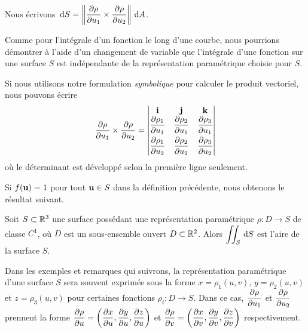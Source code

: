 {\begin{focus}{\dfn}
Nous écrivons
$\displaystyle \,\mathrm{d}S =
\left\| \frac{\partial \rho}{\partial u_1} \times \frac{\partial \rho}{\partial u_2} \right\|
\,\mathrm{d}A$.
\end{focus}

\begin{rmk}
Comme pour l'intégrale d'un fonction le long d'une courbe, nous
pourrions démontrer à l'aide d'un changement de variable
que l'intégrale d'une fonction sur une surface $S$ est
indépendante de la représentation paramétrique choisie pour $S$.
\end{rmk}

\begin{rmk}
Si nous utilisons notre formulation {\em symbolique} pour calculer le produit
vectoriel, nous pouvons écrire
\[
\frac{\partial \rho}{\partial u_1} \times \frac{\partial \rho}{\partial u_2}
= \begin{vmatrix}
\mathbf{i} & \mathbf{j} & \mathbf{k} \\
\displaystyle \frac{\partial \rho_1}{\partial u_1} & \displaystyle \frac{\partial \rho_2}{\partial u_1} &
\displaystyle \frac{\partial \rho_3}{\partial u_1} \\[0.8em]
\displaystyle \frac{\partial \rho_1}{\partial u_2} & \displaystyle \frac{\partial \rho_2}{\partial u_2} &
\displaystyle \frac{\partial \rho_3}{\partial u_2} \end{vmatrix}
\]
où le déterminant est développé selon la première ligne seulement.
\end{rmk}

Si $f(\mathbf{u}) = 1$ pour tout $\mathbf{u} \in S$ dans la définition
précédente, nous obtenons le résultat suivant.

\begin{focus}{\prp}
Soit $S \subset \mathbb{R}^3$ une surface possédant une représentation
paramétrique $\rho:D\rightarrow S$ de classe $C^1$, où $D$ est un
sous-ensemble ouvert $D \subset \mathbb{R}^2$.  Alors
$\displaystyle \iint_S \,\mathrm{d}S$ est l'aire de la surface $S$.
\end{focus}

\begin{rmk}
Dans les exemples et remarques qui suivrons, la
représentation paramétrique d'une surface $S$ sera souvent exprimée
sous la forme $x = \rho_1(u,v)$, $y=\rho_2(u,v)$ et $z = \rho_3(u,v)$ 
pour certaines fonctions $\rho_i:D\to S$.  Dans ce cas,
$\displaystyle \frac{\partial \rho}{\partial u_1}$
et $\displaystyle \frac{\partial \rho}{\partial u_2}$ prennent la forme
$\displaystyle \frac{\partial \rho}{\partial u}
= \left( \frac{\partial x}{\partial u} , \frac{\partial y}{\partial u} , \frac{\partial z}{\partial u} \right)$
et
$\displaystyle
\frac{\partial \rho}{\partial v} = \left( \frac{\partial x}{\partial v} , \frac{\partial y}{\partial v} , \frac{\partial z}{\partial v} \right)$
respectivement.
\end{rmk}

}
